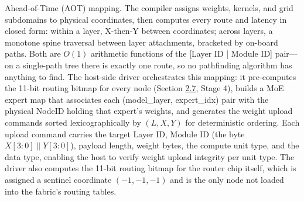 \documentclass[12pt,onecolumn]{article}
\begin{document}
Ahead-of-Time (AOT) mapping. The compiler assigns weights, kernels, and grid subdomains to physical coordinates, then computes every route and latency in closed form: within a layer, X-then-Y between coordinates; across layers, a monotone spine traversal between layer attachments, bracketed by on-board paths. Both are $O(1)$ arithmetic functions of the [Layer ID | Module ID] pair---on a single-path tree there is exactly one route, so no pathfinding algorithm has anything to find. The host-side driver orchestrates this mapping: it pre-computes the 11-bit routing bitmap for every node (Section \hyperref[sec:2.7]{2.7}, Stage 4), builds a MoE expert map that associates each (model\_layer, expert\_idx) pair with the physical NodeID holding that expert's weights, and generates the weight upload commands sorted lexicographically by $(L, X, Y)$ for deterministic ordering. Each upload command carries the target Layer ID, Module ID (the byte $X[3:0] \parallel Y[3:0]$), payload length, weight bytes, the compute unit type, and the data type, enabling the host to verify weight upload integrity per unit type. The driver also computes the 11-bit routing bitmap for the router chip itself, which is assigned a sentinel coordinate $(-1, -1, -1)$ and is the only node not loaded into the fabric's routing tables.
\end{document}
